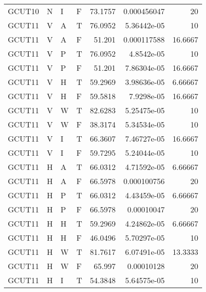 \begin{longtable}{llllrrr}
    GCUT10   & N         & I         & F          & 73.1757    & 0.000456047 & 20       \\
    GCUT11   & V         & A         & T          & 76.0952    & 5.36442e-05 & 10       \\
    GCUT11   & V         & A         & F          & 51.201     & 0.000117588 & 16.6667  \\
    GCUT11   & V         & P         & T          & 76.0952    & 4.8542e-05  & 10       \\
    GCUT11   & V         & P         & F          & 51.201     & 7.86304e-05 & 16.6667  \\
    GCUT11   & V         & H         & T          & 59.2969    & 3.98636e-05 & 6.66667  \\
    GCUT11   & V         & H         & F          & 59.5818    & 7.9298e-05  & 16.6667  \\
    GCUT11   & V         & W         & T          & 82.6283    & 5.25475e-05 & 10       \\
    GCUT11   & V         & W         & F          & 38.3174    & 5.34534e-05 & 10       \\
    GCUT11   & V         & I         & T          & 66.3607    & 7.46727e-05 & 16.6667  \\
    GCUT11   & V         & I         & F          & 59.7295    & 5.24044e-05 & 10       \\
    GCUT11   & H         & A         & T          & 66.0312    & 4.71592e-05 & 6.66667  \\
    GCUT11   & H         & A         & F          & 66.5978    & 0.000100756 & 20       \\
    GCUT11   & H         & P         & T          & 66.0312    & 4.43459e-05 & 6.66667  \\
    GCUT11   & H         & P         & F          & 66.5978    & 0.00010047  & 20       \\
    GCUT11   & H         & H         & T          & 59.2969    & 4.24862e-05 & 6.66667  \\
    GCUT11   & H         & H         & F          & 46.0496    & 5.70297e-05 & 10       \\
    GCUT11   & H         & W         & T          & 81.7617    & 6.07491e-05 & 13.3333  \\
    GCUT11   & H         & W         & F          & 65.997     & 0.00010128  & 20       \\
    GCUT11   & H         & I         & T          & 54.3848    & 5.64575e-05 & 10       \\

\end{longtable}
